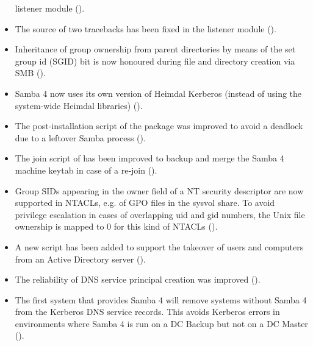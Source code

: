 \begin{itemize}
   listener module ().
\item The source of two tracebacks has been fixed in the
   listener module ().
\item Inheritance of group ownership from parent directories by means
  of the set group id (SGID) bit is now honoured during file and
  directory creation via SMB ().
\item Samba 4 now uses its own version of Heimdal Kerberos (instead
  of using the system-wide Heimdal libraries) ().
\item The post-installation script of the 
  package was improved to avoid a deadlock due to a leftover Samba
  process ().
\item The join script of  has been improved
  to backup and merge the Samba 4 machine keytab in case of a re-join
  ().
\item Group SIDs appearing in the owner field of a NT security
  descriptor are now supported in NTACLs, e.g. of GPO files in the
  sysvol share. To avoid privilege escalation in cases of overlapping
  uid and gid numbers, the Unix file ownership is mapped to 0 for this
  kind of NTACLs ().
\item A new script  has been added
  to support the takeover of users and computers from an Active
  Directory server ().
\item The reliability of DNS service principal creation was improved
  ().
\item The first system that provides Samba 4 will remove systems
  without Samba 4 from the Kerberos DNS service records. This
  avoids Kerberos errors in environments where Samba 4 is run
  on a DC Backup but not on a DC Master ().
\end{itemize}

